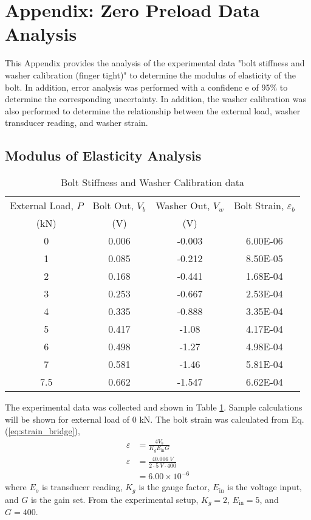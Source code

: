 \section{Appendix: Zero Preload Data Analysis}
\label{app:zero_preload_analysis}
This Appendix provides the analysis of the experimental data "bolt stiffness and washer calibration (finger tight)" to determine the modulus of elasticity of the bolt. In addition, error analysis was performed with a confidenc e of 95\% to determine the corresponding uncertainty. In addition, the washer calibration was also performed to determine the relationship between the external load, washer transducer reading, and washer strain.

\subsection{Modulus of Elasticity Analysis}
\begin{table}[h]
    \centering
    \caption{Bolt Stiffness and Washer Calibration data}
    \label{tab:modulus_of_elasticity_data}
    \begin{tabular}{cccc}
    \toprule
    External Load, $P$ & Bolt Out, $V_{b}$ & Washer Out, $V_{w}$ & Bolt Strain, $\varepsilon_b$ \\
    (kN) & (V) & (V) & \\
    \midrule
    0 & 0.006 & -0.003 & 6.00E-06 \\
    1 & 0.085 & -0.212 & 8.50E-05 \\
    2 & 0.168 & -0.441 & 1.68E-04 \\
    3 & 0.253 & -0.667 & 2.53E-04 \\
    4 & 0.335 & -0.888 & 3.35E-04 \\
    5 & 0.417 & -1.08 & 4.17E-04 \\
    6 & 0.498 & -1.27 & 4.98E-04 \\
    7 & 0.581 & -1.46 & 5.81E-04 \\
    7.5 & 0.662 & -1.547 & 6.62E-04 \\
    \bottomrule
    \end{tabular}
\end{table}
The experimental data was collected and shown in Table \ref{tab:modulus_of_elasticity_data}. Sample calculations will be shown for external load of 0 kN. The bolt strain was calculated from Eq. (\ref{eq:strain_bridge}),
\begin{align*}
    \varepsilon &= \frac{4 V_{b}}{K_g E_{\text{in}} G} \\
    \varepsilon &= \frac{4 \qty{0.006}{V}}{2 \cdot \qty{5}{V} \cdot 400} \\
    &= 6.00 \times 10^{-6}
\end{align*}
where $E_o$ is transducer reading, $K_g$ is the gauge factor, $E_{\text{in}}$ is the voltage input, and $G$ is the gain set. From the experimental setup, $K_g = 2$, $E_{\text{in}} = 5$, and $G = 400$. 

